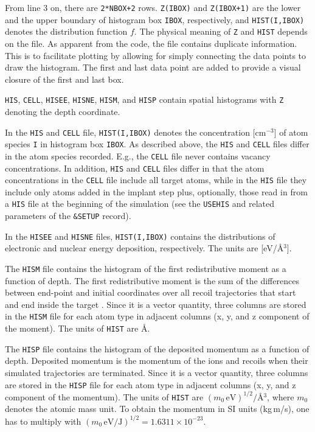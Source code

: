 From line 3 on, there are \texttt{2*NBOX+2} rows. \texttt{Z(IBOX)} and
\texttt{Z(IBOX+1)} are the lower and the upper boundary of histogram box
\texttt{IBOX}, respectively, and \texttt{HIST(I,IBOX)} denotes the distribution
function $f$. The physical meaning of \texttt{Z} and \texttt{HIST} depends on
the file. As apparent from the code, the file contains duplicate information.
This is to facilitate plotting by allowing for simply connecting the data points
to draw the histogram. The first and last data point are added to provide a
visual closure of the first and last box.

\texttt{HIS}, \texttt{CELL}, \texttt{HISEE}, \texttt{HISNE}, \texttt{HISM}, and
\texttt{HISP} contain spatial histograms with \texttt{Z} denoting the depth
coordinate. 

In the \texttt{HIS} and \texttt{CELL} file, \texttt{HIST(I,IBOX)} denotes the
concentration [cm$^{-3}$] of atom species \texttt{I} in histogram box
\texttt{IBOX}. As described above, the \texttt{HIS} and \texttt{CELL} files
differ in the atom species recorded. E.g., the \texttt{CELL} file never contains
vacancy concentrations. In addition, \texttt{HIS} and \texttt{CELL} files differ
in that the atom concentrations in the \texttt{CELL} file include all target
atoms, while in the \texttt{HIS} file they include only atoms added in the
implant step plus, optionally, those read in from a \texttt{HIS} file at the
beginning of the simulation (see the \texttt{USEHIS} and related parameters of
the \texttt{\&SETUP} record). 

In the \texttt{HISEE} and \texttt{HISNE} files, \texttt{HIST(I,IBOX)} 
contains the distributions of electronic and nuclear energy deposition,
respectively. The units are [eV/\AA$^3$]. 

The \texttt{HISM} file contains the histogram of the first redistributive moment
as a function of depth. The first redistributive moment is the sum of the
differences between end-point and initial coordinates over all recoil
trajectories that start and end inside the target \cite{hobler_crater_2018}.
Since it is a vector quantity, three columns are stored in the \texttt{HISM}
file for each atom type in adjacent columns (x, y, and z component of the
moment). The units of \texttt{HIST} are \AA. 

The \texttt{HISP} file contains the histogram of the deposited momentum as a
function of depth. Deposited momentum is the momentum of the ions and recoils
when their simulated trajectories are terminated. Since it is a vector quantity,
three columns are stored in the \texttt{HISP} file for each atom type in
adjacent columns (x, y, and z component of the momentum). The units of
\texttt{HIST} are $(m_0 \, \mathrm{eV})^{1/2}/$\AA$^3$, where $m_0$ denotes the
atomic mass unit. To obtain the momentum in SI units (kg$\,$m/s), one has to
multiply with $(m_0 \, \mathrm{eV/J})^{1/2} = 1.6311 \times 10^{-23}$.


